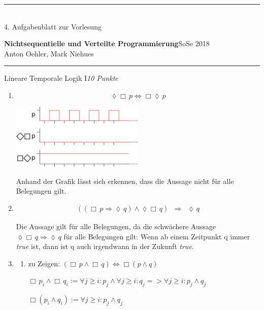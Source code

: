 \documentclass[a4paper,twoside,12pt]{article}
\newcommand{\ZETTELNUMMER}{4}
\newcounter{AUFGNR}
\newcommand{\AUFGABE}[2]{\vspace{0.3cm}\item[Aufgabe~\arabic{AUFGNR}]\stepcounter{AUFGNR} #1\hfill\emph{#2}}
\begin{document}
\pagestyle{empty}
\hrule\medskip
\rule{0ex}{0ex}\\[-1ex]
\ZETTELNUMMER. Aufgabenblatt zur Vorlesung

\smallskip
\noindent
\large
\textbf{Nichtsequentielle und Verteilte Programmierung}\hfill SoSe
2018 \\[0.5ex]
\normalsize
Anton Oehler, Mark Niehues

\newcommand{\immer}{\Box}
\newcommand{\irgendwann}{\lozenge}
\newcommand{\folgt}{\Rightarrow}
\newcommand{\oder}{\vee}
\newcommand{\und}{\wedge}

\medskip\hrule

\begin{description}
\AUFGABE{Lineare Temporale Logik I}{10 Punkte}
\begin{enumerate}
  \item { \[
     \lozenge \Box\, p \Leftrightarrow \Box \lozenge\, p
  \]}

  \includegraphics[width=0.5\textwidth]{1_a.png}

Anhand der Grafik lässt sich erkennen, dass die Aussage nicht für alle Belegungen gilt.

  \item \begin{eqnarray}
		     ((\Box\, p \Rightarrow \lozenge\, q) \land \lozenge \Box\, q )& \Rightarrow & \lozenge\, q
		\end{eqnarray}

Die Aussage gilt für alle Belegungen, da die schwächere Aussage $\lozenge \Box\, q \Rightarrow \lozenge\, q$ für alle Belegungen gilt: Wenn ab einem Zeitpunkt q immer \textit{true} ist, dann ist q auch irgendwann in der Zukunft \textit{true}.

\item
\begin{enumerate}
\item zu Zeigen: $(\Box\, p \wedge \Box\, q) \Leftrightarrow \Box (p \wedge q)$

$
\Box\, p_i \wedge \Box\, q_i := \forall j \geq i : p_j \wedge \forall j \geq i:q_j => \forall j \geq i: p_j \wedge q_j
$

$
\Box (p_i \wedge q_i) := \forall j \geq i: p_j \wedge q_j
$


\end{enumerate}
\end{enumerate}
\end{description}
\end{document}
